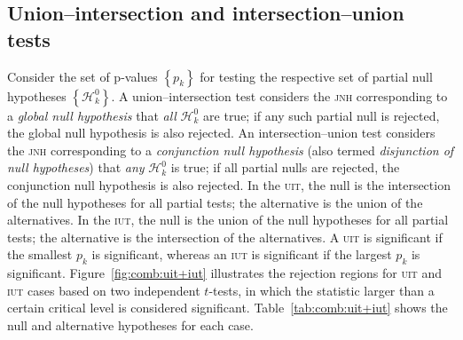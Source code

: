 \subsection{Union--intersection and intersection--union tests}
\label{sec:comb:uit+iut}

Consider the set of p-values $\left\{p_{k}\right\}$ for testing the respective set of partial null hypotheses $\left\{\mathcal{H}^{0}_{k}\right\}$. A union--intersection test \citep[\textsc{uit},][]{Roy1953} considers the \textsc{jnh} corresponding to a \emph{global null hypothesis} that \emph{all} $\mathcal{H}^{0}_{k}$ are true; if any such partial null is rejected, the global null hypothesis is also rejected. 
An intersection--union test \citep[\textsc{iut},][]{Berger1982} considers the \textsc{jnh} corresponding to a \emph{conjunction null hypothesis} (also termed \emph{disjunction of null hypotheses}) that \emph{any} $\mathcal{H}^{0}_{k}$ is true; if all partial nulls are rejected, the conjunction null hypothesis is also rejected. In the \textsc{uit}, the null is the intersection of the null hypotheses for all partial tests; the alternative is the union of the alternatives. In the \textsc{iut}, the null is the union of the null hypotheses for all partial tests; the alternative is the intersection of the alternatives. A \textsc{uit} is significant if the smallest $p_{k}$ is significant, whereas an \textsc{iut} is significant if the largest $p_{k}$ is significant. Figure~\ref{fig:comb:uit+iut} illustrates the rejection regions for \textsc{uit} and \textsc{iut} cases based on two independent $t$-tests, in which the statistic larger than a certain critical level is considered significant. Table~\ref{tab:comb:uit+iut} shows the null and alternative hypotheses for each case.

